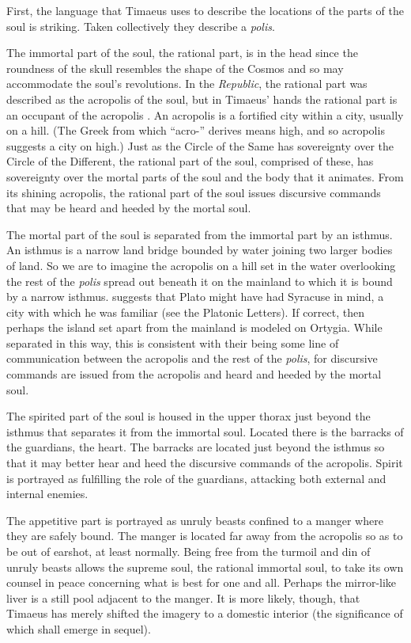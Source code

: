First, the language that Timaeus uses to describe the locations of the parts of the soul is striking. Taken collectively they describe a \emph{polis}. 

The immortal part of the soul, the rational part, is in the head since the roundness of the skull resembles the shape of the Cosmos and so may accommodate the soul's revolutions. In the \emph{Republic}, the rational part was described as the acropolis of the soul, but in Timaeus' hands the rational part is an occupant of the acropolis \citep[81]{Price:1995hc}. An acropolis is a fortified city within a city, usually on a hill. (The Greek from which ``acro-'' derives means high, and so acropolis suggests a city on high.) Just as the Circle of the Same has sovereignty over the Circle of the Different, the rational part of the soul, comprised of these, has sovereignty over the mortal parts of the soul and the body that it animates. From its shining acropolis, the rational part of the soul issues discursive commands that may be heard and heeded by the mortal soul.

The mortal part of the soul is separated from the immortal part by an isthmus. An isthmus is a narrow land bridge bounded by water joining two larger bodies of land. So we are to imagine the acropolis on a hill set in the water overlooking the rest of the \emph{polis} spread out beneath it on the mainland to which it is bound by a narrow isthmus. \citet[500]{Taylor:1928qb} suggests that Plato might have had Syracuse in mind, a city with which he was familiar (see the Platonic Letters). If correct, then perhaps the island set apart from the mainland is modeled on Ortygia. While separated in this way, this is consistent with their being some line of communication between the acropolis and the rest of the \emph{polis}, for discursive commands are issued from the acropolis and heard and heeded by the mortal soul. 

The spirited part of the soul is housed in the upper thorax just beyond the isthmus that separates it from the immortal soul. Located there is the barracks of the guardians, the heart. The barracks are located just beyond the isthmus so that it may better hear and heed the discursive commands of the acropolis. Spirit is portrayed as fulfilling the role of the guardians, attacking both external and internal enemies.

The appetitive part is portrayed as unruly beasts confined to a manger where they are safely bound. The manger is located far away from the acropolis so as to be out of earshot, at least normally. Being free from the turmoil and din of unruly beasts allows the supreme soul, the rational immortal soul, to take its own counsel in peace concerning what is best for one and all. Perhaps the mirror-like liver is a still pool adjacent to the manger. It is more likely, though, that Timaeus has merely shifted the imagery to a domestic interior (the significance of which shall emerge in sequel).

